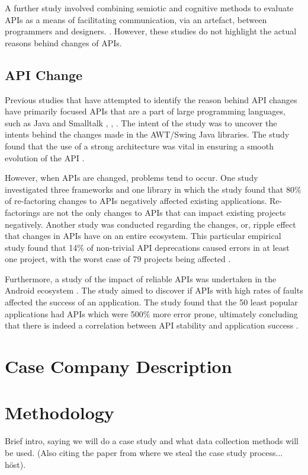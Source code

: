 \documentclass[10pt,twocolumn]{article}
\begin{document}
A further study involved combining semiotic and cognitive methods to evaluate APIs as a means of facilitating communication, via an artefact, between programmers and designers. \cite{afonso2012evaluating}. However, these studies do not highlight the actual reasons behind changes of APIs.

\subsection{API Change}
Previous studies that have attempted to identify the reason behind API changes have primarily focused APIs that are a part of large programming languages, such as Java and Smalltalk \cite{robbes2012developers}, \cite{shi2011empirical}, \cite{hou2011exploring}. The intent of the study was to uncover the intents behind the changes made in the AWT/Swing Java libraries. The study found that the use of a strong architecture was vital in ensuring a smooth evolution of the API \cite{hou2011exploring}.

However, when APIs are changed, problems tend to occur. One study investigated three frameworks and one library in which the study found that 80\% of re-factoring changes to APIs negatively affected existing applications. Re-factorings are not the only changes to APIs that can impact existing projects negatively. Another study was conducted regarding the changes, or, ripple effect that changes in APIs have on an entire ecosystem. This particular empirical study found that 14\% of non-trivial API deprecations caused errors in at least one project, with the worst case of 79 projects being affected \cite{robbes2012developers}.

Furthermore, a study of the impact of reliable APIs was undertaken in the Android ecosystem \cite{mcdonnell2013empirical}. The study aimed to discover if APIs with high rates of faults affected the success of an application. The study found that the 50 least popular applications had APIs which were 500\% more error prone, ultimately concluding that there is indeed a correlation between API stability and application success \cite{mcdonnell2013empirical}. 

\section{Case Company Description}



\section{Methodology}
Brief intro, saying we will do a case study and what data collection methods will be used. (Also citing the paper from where we steal the case study process... höst).
\end{document}
